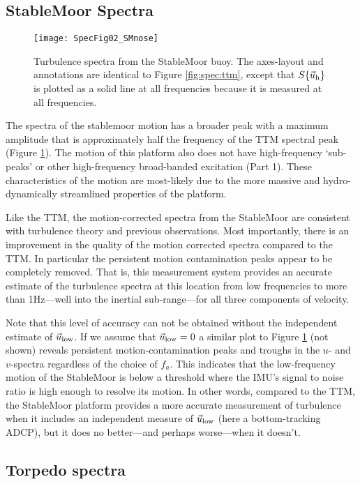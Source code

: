 \subsection{StableMoor Spectra}

\begin{figure*}[th]
  \centering
  \texttt{[image: SpecFig02\_SMnose]}
  \caption{Turbulence spectra from the StableMoor buoy. The axes-layout and annotations are identical to Figure \ref{fig:spec:ttm}, except that $S\{\vec{u}_\mathrm{h}\}$ is plotted as a solid line at all frequencies because it is measured at all frequencies. }
  \label{fig:spec:sm}
\end{figure*}

The spectra of the stablemoor motion has a broader peak with a maximum amplitude that is approximately half the frequency of the TTM spectral peak (Figure \ref{fig:spec:sm}). The motion of this platform also does not have high-frequency `sub-peaks' or other high-frequency broad-banded excitation (Part 1).  These characteristics of the motion are most-likely due to the more massive and hydro-dynamically streamlined properties of the platform. 

Like the TTM, the motion-corrected spectra from the StableMoor are consistent with turbulence theory and previous observations. Most importantly, there is an improvement in the quality of the motion corrected spectra compared to the TTM. In particular the persistent motion contamination peaks appear to be completely removed. That is, this measurement system provides an accurate estimate of the turbulence spectra at this location from low frequencies to more than 1Hz---well into the inertial sub-range---for all three components of velocity.

Note that this level of accuracy can not be obtained without the independent estimate of $\vec{u}_\mathrm{low}$. If we assume that $\vec{u}_\mathrm{low}=0$ a similar plot to Figure \ref{fig:spec:sm} (not shown) reveals persistent motion-contamination peaks and troughs in the $u$- and $v$-spectra regardless of the choice of $f_a$. This indicates that the low-frequency motion of the StableMoor is below a threshold where the IMU's signal to noise ratio is high enough to resolve its motion. In other words, compared to the TTM, the StableMoor platform provides a more accurate measurement of turbulence when it includes an independent measure of $\vec{u}_\mathrm{low}$ (here a bottom-tracking ADCP), but it does no better---and perhaps worse---when it doesn't.

\subsection{Torpedo spectra}

